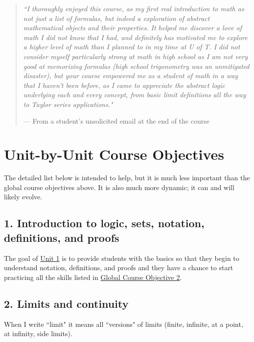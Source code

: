 \documentclass[11pt]{article}
\begin{document}
	\begin{quotation}
		\noindent
		\emph{``I thoroughly enjoyed this course, as my first real introduction to math
		as not just a list of formulas, but indeed a exploration of abstract
		mathematical objects and their properties. It helped me discover a love of math
		I did not know that I had, and definitely has motivated me to explore a
		higher level of math than I planned to in my time at U of T. I did not consider
		myself particularly strong at math in high school as I am not very good at memorizing
		formulas (high school trigonometry was an unmitigated disaster), but your
		course empowered me as a student of math in a way that I haven't been before,
		as I came to appreciate the abstract logic underlying each and every concept,
		from basic limit definitions all the way to Taylor series applications."}

		\hfill --- From a student's unsolicited email at the end of the course
	\end{quotation}

	\newpage
	\section{Unit-by-Unit Course Objectives}


	\begin{warning}
		The detailed list below is intended to help, but it is much less important
		than the global course objectives above. It is also much more dynamic; it
		can and will likely evolve.
	\end{warning}

	\setcounter{subsection}{0}

	\subsection{1. Introduction to logic, sets, notation, definitions, and proofs}


	The goal of \hyperref[unit1]{Unit 1} is to provide students with the basics so
	that they begin to understand notation, definitions, and proofs and they have a
	chance to start practicing all the skills listed in \hyperref[CO2]{Global
	Course Objective 2}.

	\subsection{2. Limits and continuity}


	When I write ``limit" it means all ``versions" of limits (finite, infinite, at
	a point, at infinity, side limits).
\end{document}
